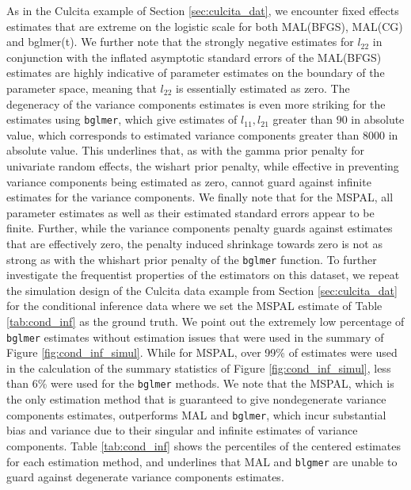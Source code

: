 \documentclass[11pt, a4paper]{article}
\theoremstyle{example} \newtheorem{example}{Example}[section]
\theoremstyle{theorem} \newtheorem{theorem}{Theorem}[section]
\begin{document}
As in the Culcita example of Section \ref{sec:culcita_dat}, we encounter fixed effects estimates that are extreme on the logistic scale for both MAL(BFGS), MAL(CG) and bglmer(t). We further note that the strongly negative estimates for $l_{22}$ in conjunction with the inflated asymptotic standard errors of the MAL(BFGS) estimates are highly indicative of parameter estimates on the boundary of the parameter space, meaning that $l_{22}$ is essentially estimated as zero. The degeneracy of the variance components estimates is even more striking for the estimates using \texttt{bglmer}, which give estimates of $l_{11},l_{21}$ greater than $90$ in absolute value, which corresponds to estimated variance components greater than $8000$ in absolute value. This underlines that, as with the gamma prior penalty for univariate random effects, the wishart prior penalty, while effective in preventing variance components being estimated as zero, cannot guard against infinite estimates for the variance components. We finally note that for the MSPAL, all parameter estimates as well as their estimated standard errors appear to be finite. Further, while the variance components penalty guards against estimates that are effectively zero, the penalty induced shrinkage towards zero is not as strong as with the whishart prior penalty of the \texttt{bglmer} function. To further investigate the frequentist properties of the estimators on this dataset, we repeat the simulation design of the Culcita data example from Section \ref{sec:culcita_dat} for the conditional inference data where we set the MSPAL estimate of Table \ref{tab:cond_inf} as the ground truth. We point out the extremely low percentage of \texttt{bglmer} estimates without estimation issues that were used in the summary of Figure \ref{fig:cond_inf_simul}. While for MSPAL, over 99\% of estimates were used in the calculation of the summary statistics of Figure \ref{fig:cond_inf_simul}, less than 6\% were used for the  \texttt{bglmer} methods. We note that the MSPAL, which is the only estimation method that is guaranteed to give nondegenerate variance components estimates, outperforms MAL and \texttt{bglmer}, which incur substantial bias and variance due to their singular and infinite estimates of variance components. Table \ref{tab:cond_inf} shows the percentiles of the centered estimates for each estimation method, and underlines that MAL and \texttt{blgmer} are unable to guard against degenerate variance components estimates. 
\end{document}
